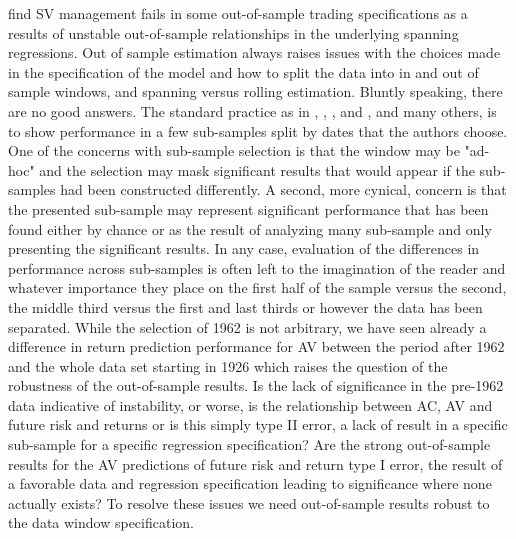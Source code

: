 \citet{cederburg_2019} find SV management fails in some out-of-sample trading specifications as a results of unstable out-of-sample relationships in the underlying spanning regressions.%
Out of sample estimation always raises issues with the choices made in the specification of the model and how to split the data into in and out of sample windows, and spanning versus rolling estimation. 
Bluntly speaking, there are no good answers. The standard practice as in \citet{Rapach2013}, \citet{Rapach2010}, \citet{Rapach2016}, and \cite{Huang2015}, and many others, is to show performance in a few sub-samples split by dates that the authors choose. One of the concerns with sub-sample selection is that the window may be "ad-hoc" and the selection may mask significant results that would appear if the sub-samples had been constructed differently. A second, more cynical, concern is that the presented sub-sample may represent significant performance that has been found either by chance or as the result of analyzing many sub-sample and only presenting the significant results. In any case, evaluation of the differences in performance across sub-samples is often left to the imagination of the reader and whatever importance they place on the first half of the sample versus the second, the middle third versus the first and last thirds or however the data has been separated. While the selection of 1962 is not arbitrary, we have seen already a difference in return prediction performance for AV between the period after 1962 and the whole data set starting in 1926 which raises the question of the robustness of the out-of-sample results. Is the lack of significance in the pre-1962 data indicative of instability, or worse, is the relationship between AC, AV and future risk and returns or is this simply type II error, a lack of result in a specific sub-sample for a specific regression specification? Are the strong out-of-sample results for the AV predictions of future risk and return type I error, the result of a favorable data and regression specification leading to significance where none actually exists? To resolve these issues we need out-of-sample results robust to the data window specification. 

